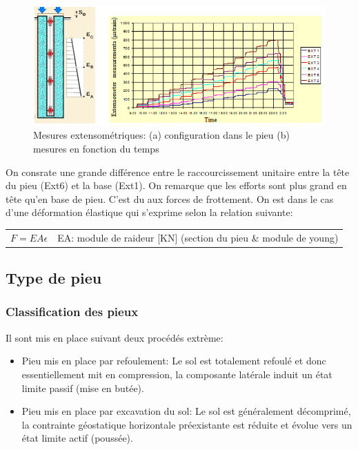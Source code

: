         \begin{figure}[h!]
            \centering
            \includegraphics[scale=0.8]{Holeyman/images/H34.PNG}
            \caption{Mesures extensométriques:  (a) configuration dans le pieu  (b) mesures en fonction du temps}
        \end{figure}
        
        On consrate une grande différence entre le raccourcissement unitaire entre la tête du pieu (Ext6) et la base (Ext1). On remarque que les efforts sont plus grand en tête qu'en base de pieu. C'est du aux forces de frottement. On est dans le cas d'une déformation élastique qui s'exprime selon la relation suivante: 
        
        \begin{center}
        \begin{tabular}{c|c}
            $F = EA \epsilon$  & EA: module de raideur [KN] (section du pieu \& module de young) 
        \end{tabular}
        \end{center} 
        
    \subsection{Type de pieu}
    
        \subsubsection{Classification des pieux}
        
        Il sont mis en place suivant deux procédés extrème:
        
        \begin{itemize}
            \item Pieu mis en place par refoulement: Le sol est totalement refoulé et donc essentiellement mit en compression, la composante latérale induit un état limite passif (mise en butée).
            \item Pieu mis en place par excavation du sol: Le sol est généralement décomprimé, la contrainte géostatique horizontale préexistante est réduite et évolue vers un état limite actif (poussée).
        \end{itemize} 
        
